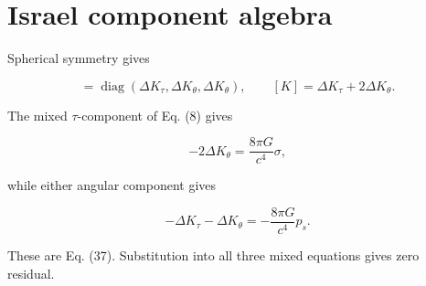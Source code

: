 \documentclass[pdflatex,sn-mathphys-num]{sn-jnl}
\begin{document}
\section{Israel component algebra}

Spherical symmetry gives


\begin{equation}
[K^a{}_b]
=\operatorname{diag}(\Delta K_\tau,\Delta K_\theta,\Delta K_\theta),
\qquad
[K]=\Delta K_\tau+2\Delta K_\theta.
\tag{B1}
\end{equation}

The mixed \(\tau\)-component of Eq. (8) gives


\begin{equation}
-2\Delta K_\theta
=\frac{8\pi G}{c^4}\sigma,
\tag{B2}
\end{equation}

while either angular component gives


\begin{equation}
-\Delta K_\tau-\Delta K_\theta
=-\frac{8\pi G}{c^4}p_s.
\tag{B3}
\end{equation}

These are Eq. (37). Substitution into all three mixed equations gives zero residual.
\end{document}
